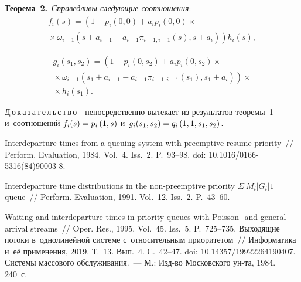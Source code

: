 \begin{multicols}{2}
\smallskip

\noindent
\textbf{Теорема~2.}\
\textit{Справедливы следующие соотношения}:
\begin{multline*}
f_i(s)=\left(1-p_i(0,0)+a_ip_i(0,0)\times{}\right.\\
\left.{}\times\omega_{i-1} \left(s+a_{i-1}-a_{i-1}\pi_{i-1,i-1}(s),s+a_i\right)\right)h_i(s),
\end{multline*}


\vspace*{-12pt}

\noindent
\begin{multline*}
g_i(s_1,s_2)=\left(1-p_i(0,s_2)+a_ip_i(0,s_2)\times{}\right.\\
\left.{}\times\omega_{i-1}\left(s_1+a_{i-1}-a_{i-1}\pi_{i-1,i-1}(s_1),s_1+a_i\right)\right)\times{}\\
{}\times h_i(s_1).
\end{multline*}


\noindent
Д\,о\,к\,а\,з\,а\,т\,е\,л\,ь\,с\,т\,в\,о\ \ непосредственно вытекает из результатов теоремы~1 и~соотношений
$f_i(s)\hm=p_i\left(1,s\right)$ и~$g_i(s_1,s_2)\hm=q_i\left(1,1,s_1,s_2\right).$

{\small\frenchspacing
{%
\begin{thebibliography}{9}
 Interdeparture times from a queuing system with preemptive resume priority~// 
Perform. Evaluation, 1984. Vol.~4. Iss.~2. P.~93--98.
doi: 10.1016/0166-\mbox{5316(84)90003-8}.

 Interdeparture time distributions in the non-preemptive priority 
$\Sigma\ M_i|G_i|1$ queue~// Perform. Evaluation, 1991. Vol.~12. Iss.~2.   P.~43--60.

 Waiting and interdeparture times in priority queues with
 Poisson- and general-arrival streams~// Oper.
Res., 1995. Vol.~45. Iss.~5. P.~725--735.
 Выходящие потоки в~однолинейной системе 
с~относительным приоритетом~// Информатика и~её применения, 2019. Т.~13. Вып.~4. С.~42--47.
 doi: 10.14357/19922264190407.
 Системы массового
обслуживания.~--- М.: Изд-во Московского ун-та, 1984. 240~с.
 \end{thebibliography}

}
}

\end{multicols}

